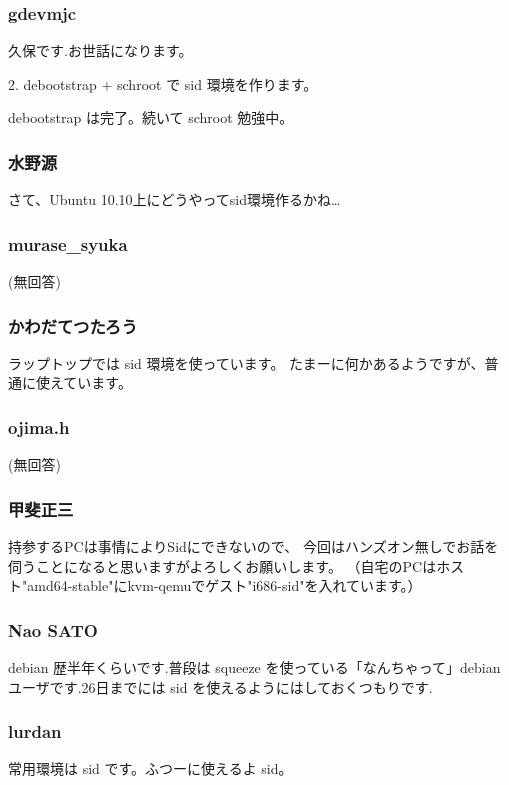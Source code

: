 \documentclass[cjk,dvipdfmx,12pt,%
hyperref={bookmarks=true,bookmarksnumbered=true,bookmarksopen=false,%
colorlinks=false,%
pdftitle={第 50 回 関西 Debian 勉強会},%
pdfauthor={倉敷・のがた・佐々木},%
pdfsubject={資料},%
}]{beamer}
\begin{document}
\begin{frame}[fragile]
\frametitle{ gdevmjc }
久保です.お世話になります。

2. debootstrap + schroot で sid 環境を作ります。

debootstrap は完了。続いて schroot 勉強中。
\end{frame}

\begin{frame}[fragile]
\frametitle{ 水野源 }

さて、Ubuntu 10.10上にどうやってsid環境作るかね…

\end{frame}

\begin{frame}[fragile]
\frametitle{ murase\_syuka }

(無回答)

\end{frame}

\begin{frame}[fragile]
\frametitle{ かわだてつたろう }

ラップトップでは sid 環境を使っています。
たまーに何かあるようですが、普通に使えています。
\end{frame}

\begin{frame}[fragile]
\frametitle{ ojima.h }

(無回答)

\end{frame}

\begin{frame}[fragile]
\frametitle{ 甲斐正三 }

持参するPCは事情によりSidにできないので、
今回はハンズオン無しでお話を伺うことになると思いますがよろしくお願いします。
（自宅のPCはホスト"amd64-stable"にkvm-qemuでゲスト"i686-sid"を入れています。）

\end{frame}

\begin{frame}[fragile]
\frametitle{ Nao SATO }

debian 歴半年くらいです.普段は squeeze を使っている「なんちゃって」debian ユーザです.26日までには sid を使えるようにはしておくつもりです.

\end{frame}

\begin{frame}[fragile]
\frametitle{ lurdan }

常用環境は sid です。ふつーに使えるよ sid。

\end{frame}
\end{document}
